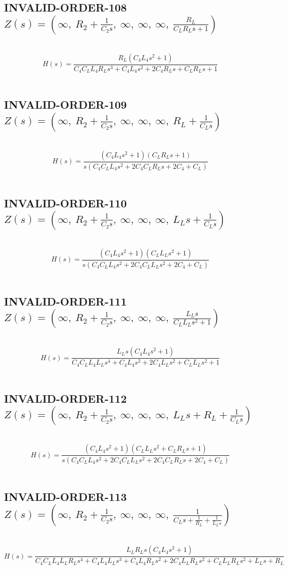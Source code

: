 \documentclass{article}
\begin{document}
\subsection{INVALID-ORDER-108 $Z(s) = \left( \infty, \  R_{2} + \frac{1}{C_{2} s}, \  \infty, \  \infty, \  \infty, \  \frac{R_{L}}{C_{L} R_{L} s + 1}\right)$ } \ 
\textbf{\[H(s) = \frac{R_{L} \left(C_{4} L_{4} s^{2} + 1\right)}{C_{4} C_{L} L_{4} R_{L} s^{3} + C_{4} L_{4} s^{2} + 2 C_{4} R_{L} s + C_{L} R_{L} s + 1}\] } \ 
\subsection{INVALID-ORDER-109 $Z(s) = \left( \infty, \  R_{2} + \frac{1}{C_{2} s}, \  \infty, \  \infty, \  \infty, \  R_{L} + \frac{1}{C_{L} s}\right)$ } \ 
\textbf{\[H(s) = \frac{\left(C_{4} L_{4} s^{2} + 1\right) \left(C_{L} R_{L} s + 1\right)}{s \left(C_{4} C_{L} L_{4} s^{2} + 2 C_{4} C_{L} R_{L} s + 2 C_{4} + C_{L}\right)}\] } \ 
\subsection{INVALID-ORDER-110 $Z(s) = \left( \infty, \  R_{2} + \frac{1}{C_{2} s}, \  \infty, \  \infty, \  \infty, \  L_{L} s + \frac{1}{C_{L} s}\right)$ } \ 
\textbf{\[H(s) = \frac{\left(C_{4} L_{4} s^{2} + 1\right) \left(C_{L} L_{L} s^{2} + 1\right)}{s \left(C_{4} C_{L} L_{4} s^{2} + 2 C_{4} C_{L} L_{L} s^{2} + 2 C_{4} + C_{L}\right)}\] } \ 
\subsection{INVALID-ORDER-111 $Z(s) = \left( \infty, \  R_{2} + \frac{1}{C_{2} s}, \  \infty, \  \infty, \  \infty, \  \frac{L_{L} s}{C_{L} L_{L} s^{2} + 1}\right)$ } \ 
\textbf{\[H(s) = \frac{L_{L} s \left(C_{4} L_{4} s^{2} + 1\right)}{C_{4} C_{L} L_{4} L_{L} s^{4} + C_{4} L_{4} s^{2} + 2 C_{4} L_{L} s^{2} + C_{L} L_{L} s^{2} + 1}\] } \ 
\subsection{INVALID-ORDER-112 $Z(s) = \left( \infty, \  R_{2} + \frac{1}{C_{2} s}, \  \infty, \  \infty, \  \infty, \  L_{L} s + R_{L} + \frac{1}{C_{L} s}\right)$ } \ 
\textbf{\[H(s) = \frac{\left(C_{4} L_{4} s^{2} + 1\right) \left(C_{L} L_{L} s^{2} + C_{L} R_{L} s + 1\right)}{s \left(C_{4} C_{L} L_{4} s^{2} + 2 C_{4} C_{L} L_{L} s^{2} + 2 C_{4} C_{L} R_{L} s + 2 C_{4} + C_{L}\right)}\] } \ 
\subsection{INVALID-ORDER-113 $Z(s) = \left( \infty, \  R_{2} + \frac{1}{C_{2} s}, \  \infty, \  \infty, \  \infty, \  \frac{1}{C_{L} s + \frac{1}{R_{L}} + \frac{1}{L_{L} s}}\right)$ } \ 
\textbf{\[H(s) = \frac{L_{L} R_{L} s \left(C_{4} L_{4} s^{2} + 1\right)}{C_{4} C_{L} L_{4} L_{L} R_{L} s^{4} + C_{4} L_{4} L_{L} s^{3} + C_{4} L_{4} R_{L} s^{2} + 2 C_{4} L_{L} R_{L} s^{2} + C_{L} L_{L} R_{L} s^{2} + L_{L} s + R_{L}}\] } \ 
\end{document}
